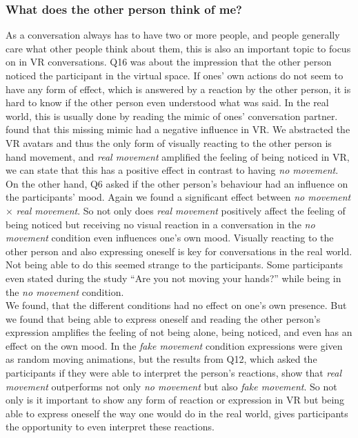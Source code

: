 \documentclass[english,runningheads,a4paper]{llncs}[2018/03/10]
\begin{document}
\subsubsection{What does the other person think of me?}
As a conversation always has to have two or more people, and people generally care what other people think about them, this is also an important topic to focus on in VR conversations. 
Q16 was about the impression that the other person noticed the participant in the virtual space.
If ones' own actions do not seem to have any form of effect, which is answered by a reaction by the other person, it is hard to know if the other person even understood what was said.
In the real world, this is usually done by reading the mimic of ones' conversation partner. 
\citet{staahl1999meetings} found that this missing mimic had a negative influence in VR.
We abstracted the VR avatars and thus the only form of visually reacting to the other person is hand movement, and \textit{real movement} amplified the feeling of being noticed in VR, we can state that this has a positive effect in contrast to having \textit{no movement}.
On the other hand, Q6 asked if the other person's behaviour had an influence on the participants' mood.
Again we found a significant effect between \textit{no movement} $\times$ \textit{real movement}.
So not only does \textit{real movement} positively affect the feeling of being noticed but receiving no visual reaction in a conversation in the \textit{no movement} condition even influences one's own mood.
Visually reacting to the other person and also expressing oneself is key for conversations in the real world.
Not being able to do this seemed strange to the participants. 
Some participants even stated during the study ``Are you not moving your hands?'' while being in the \textit{no movement} condition. \\ \linebreak
We found, that the different conditions had no effect on one's own presence.
But we found that being able to express oneself and reading the other person's expression amplifies the feeling of not being alone, being noticed, and even has an effect on the own mood.
In the \textit{fake movement} condition expressions were given as random moving animations, but the results from Q12, which asked the participants if they were able to interpret the person's reactions, show that \textit{real movement} outperforms not only \textit{no movement} but also \textit{fake movement}.
So not only is it important to show any form of reaction or expression in VR but being able to express oneself the way one would do in the real world, gives participants the opportunity to even interpret these reactions.
\end{document}
